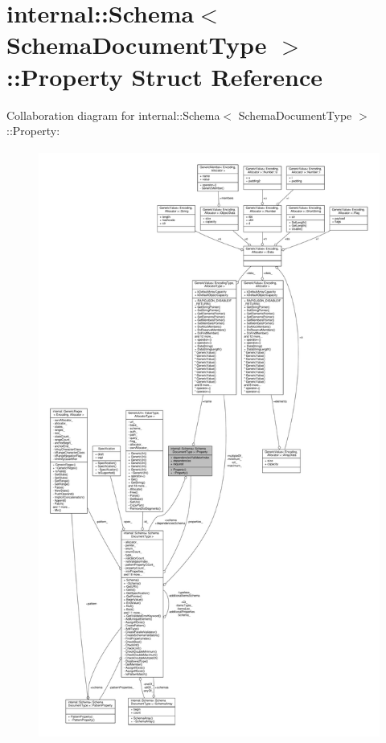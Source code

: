 \hypertarget{structinternal_1_1Schema_1_1Property}{}\section{internal\+:\+:Schema$<$ Schema\+Document\+Type $>$\+:\+:Property Struct Reference}
\label{structinternal_1_1Schema_1_1Property}


Collaboration diagram for internal\+:\+:Schema$<$ Schema\+Document\+Type $>$\+:\+:Property\+:
\nopagebreak
\begin{figure}[H]
\begin{center}
\leavevmode
\includegraphics[height=550pt]{structinternal_1_1Schema_1_1Property__coll__graph}
\end{center}
\end{figure}
